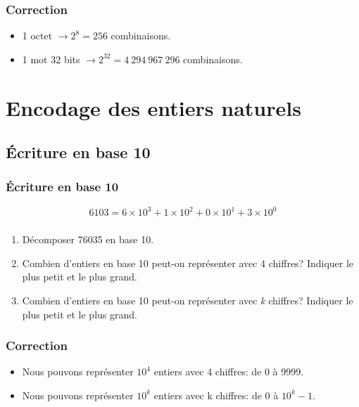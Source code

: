 \documentclass[svgnames,11pt]{beamer}
\begin{document}
\begin{frame}
    \frametitle{Correction}

    \begin{itemize}
        \item 1 octet $\rightarrow 2^8 = 256$ combinaisons.
        \item 1 mot 32 bits $\rightarrow 2^{32} = 4~294~967~296$ combinaisons.
    \end{itemize}
\end{frame}
\section{Encodage des entiers naturels}
\subsection{Écriture en base 10}
\begin{frame}
    \frametitle{Écriture en base 10}

    $$6103 = 6×10^3 + 1×10^2 + 0×10^1 + 3×10^0$$


\end{frame}
\begin{frame}
    \frametitle{}

    \begin{activite}
        \begin{enumerate}
        \item Décomposer 76035 en base 10.
        \item Combien d'entiers en base 10 peut-on représenter avec 4 chiffres? Indiquer le plus petit et le plus grand.
        \item Combien d'entiers en base 10 peut-on représenter avec \emph{k} chiffres? Indiquer le plus petit et le plus grand.
        \end{enumerate}
        \end{activite}

\end{frame}
\begin{frame}
    \frametitle{Correction}

    \begin{itemize}
        \item Nous pouvons représenter $10^4$
        entiers avec 4 chiffres: de 0 à 9999.
        \item Nous pouvons représenter $10^k$
        entiers avec k chiffres: de 0 à $10^k−1$.
    \end{itemize}

\end{frame}
\end{document}
